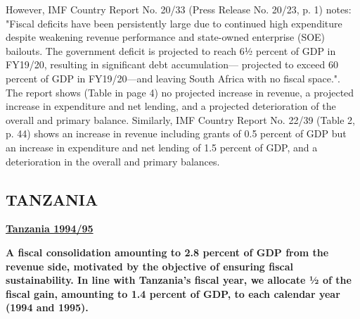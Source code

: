 However, IMF Country Report No. 20/33 (Press Release No. 20/23, p. 1) notes: "Fiscal deficits have been persistently large due to continued high expenditure despite weakening revenue performance and state-owned enterprise (SOE) bailouts. The government deficit is projected to reach 6½ percent of GDP in FY19/20, resulting in significant debt accumulation— projected to exceed 60 percent of GDP in FY19/20—and leaving South Africa with no fiscal space.". The report shows (Table in page 4) no projected increase in revenue, a projected increase in expenditure and net lending, and a projected deterioration of the overall and primary balance. Similarly, IMF Country Report No. 22/39 (Table 2, p. 44) shows an increase in revenue including grants of 0.5 percent of GDP but an increase in expenditure and net lending of 1.5 percent of GDP, and a deterioration in the overall and primary balances. 

\subsection[TANZANIA]{TANZANIA\protect\footnotemark}

\textbf{\underline {Tanzania 1994/95}} 

\textbf{A fiscal consolidation amounting to 2.8 percent of GDP from the revenue side, motivated by the objective of ensuring fiscal sustainability. In line with Tanzania’s fiscal year, we allocate ½ of the fiscal gain, amounting to 1.4 percent of GDP, to each calendar year (1994 and 1995).}

